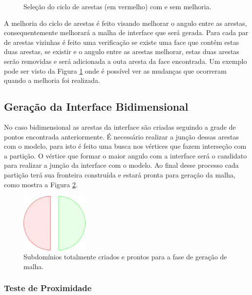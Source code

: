 \begin{figure}[ht]
{	}
	\caption{Seleção do ciclo de arestas (em vermelho) com e sem melhoria.}
	\label{fig:melhoria_arestas_faces}
\end{figure}


A melhoria do ciclo de arestas é feito visando melhorar o angulo entre as arestas, consequentemente melhorará a malha de interface que será gerada. Para cada par de arestas vizinhas é feito uma verificação se existe uma face que contém estas duas arestas, se existir e o angulo entre as arestas melhorar, estas duas arestas serão removidas e será adicionada a outa aresta da face encontrada. Um exemplo pode ser visto da Figura \ref{fig:melhoria_arestas_faces} onde é possível ver as mudanças que ocorreram quando a melhoria foi realizada.

\subsection{Geração da Interface Bidimensional}

No caso bidimensional as arestas da interface são criadas seguindo a grade de pontos encontrada anteriormente. É necessário realizar a junção dessas arestas com o modelo, para isto é feito uma busca nos vértices que fazem interseção com a partição. O vértice que formar o maior angulo com a interface será o candidato para realizar a junção da interface com o modelo. Ao final desse processo cada partição terá sua fronteira construída e estará pronta para geração da malha, como mostra a Figura \ref{fig:subdominios2D_montados}.


\begin{figure}[!ht]
	\centering
	\includegraphics[width=0.3\textwidth]{fig/subdominios2D_montados.png}
	\caption{Subdomínios totalmente criados e prontos para a fase de geração de malha.}
	\label{fig:subdominios2D_montados}
\end{figure}


\subsubsection{Teste de Proximidade}
\label{sec:Teste_proximidade}

